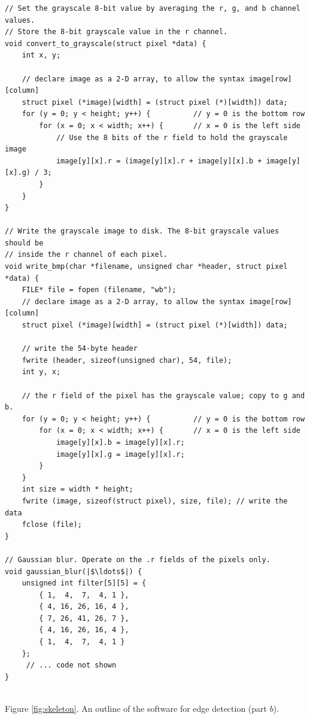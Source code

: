 \documentclass[epsfig,10pt,fullpage]{article}
\begin{document}
\lstset{language=C,numbers=none,escapechar=|}
\begin{center}
\begin{minipage}[t]{15.5 cm}
\begin{lstlisting}[name=skeleton]
// Set the grayscale 8-bit value by averaging the r, g, and b channel values.
// Store the 8-bit grayscale value in the r channel.
void convert_to_grayscale(struct pixel *data) {
    int x, y;
    
    // declare image as a 2-D array, to allow the syntax image[row][column]
    struct pixel (*image)[width] = (struct pixel (*)[width]) data;
    for (y = 0; y < height; y++) {          // y = 0 is the bottom row
        for (x = 0; x < width; x++) {       // x = 0 is the left side
            // Use the 8 bits of the r field to hold the grayscale image
            image[y][x].r = (image[y][x].r + image[y][x].b + image[y][x].g) / 3;
        }
    }
}

// Write the grayscale image to disk. The 8-bit grayscale values should be
// inside the r channel of each pixel.
void write_bmp(char *filename, unsigned char *header, struct pixel *data) {
    FILE* file = fopen (filename, "wb");
    // declare image as a 2-D array, to allow the syntax image[row][column]
    struct pixel (*image)[width] = (struct pixel (*)[width]) data;
    
    // write the 54-byte header
    fwrite (header, sizeof(unsigned char), 54, file); 
    int y, x;
    
    // the r field of the pixel has the grayscale value; copy to g and b.
    for (y = 0; y < height; y++) {          // y = 0 is the bottom row
        for (x = 0; x < width; x++) {       // x = 0 is the left side
            image[y][x].b = image[y][x].r;
            image[y][x].g = image[y][x].r;
        }
    }
    int size = width * height;
    fwrite (image, sizeof(struct pixel), size, file); // write the data
    fclose (file);
}

// Gaussian blur. Operate on the .r fields of the pixels only.
void gaussian_blur(|$\ldots$|) {
    unsigned int filter[5][5] = {
        { 1,  4,  7,  4, 1 },
        { 4, 16, 26, 16, 4 },
        { 7, 26, 41, 26, 7 },
        { 4, 16, 26, 16, 4 },
        { 1,  4,  7,  4, 1 }
    };
	 // ... code not shown
}

\end{lstlisting}
~\\
Figure \ref{fig:skeleton}. An outline of the software for edge detection (part $b$).
\end{minipage}
\end{center}
\end{document}

